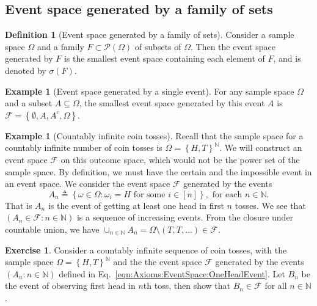 \documentclass[letterpaper,10pt,english]{article}
\theoremstyle{plain}
\theoremstyle{definition}
\newtheorem{defn}[thm]{Definition}
\newtheorem{exmp}[thm]{Example}
\newtheorem{exerc}[thm]{Exercise}
\theoremstyle{remark}
\newcommand{\EQ}[1]{\begin{equation*}#1\end{equation*}}
\newcommand{\EQN}[1]{\begin{equation}#1\end{equation}}
\newcommand{\set}[1]{\left\{#1\right\}}
\newcommand{\N}{\mathbb{N}}
\newcommand{\cP}{\mathcal{P}}
\newcommand{\sF}{\mathscr{F}}
\begin{document}
\subsection{Event space generated by a family of sets}
\begin{defn}[Event space generated by a family of sets] 
Consider a sample space $\Omega$ and a family $F \subset \cP(\Omega)$ of subsets of $\Omega$.   
Then the event space generated by $F$ is the smallest event space containing each element of $F$, 
and is denoted by $\sigma(F)$. 
\end{defn}
\begin{shaded}
\begin{exmp}[Event space generated by a single event]
For any sample space $\Omega$ and a subset $A \subseteq \Omega$, the smallest event space generated by this event $A$ is 
$\sF = \set{\emptyset, A, A^c, \Omega}$. 
\end{exmp}
\begin{exmp}[Countably infinite coin tosses] 
Recall that the sample space for a countably infinite number of coin tosses is $\Omega = \set{H, T}^\N$.  
We will construct an event space $\sF$ on this outcome space, which would not be the power set of the sample space. 
By definition, we must have the certain and the impossible event in an event space.
We consider the event space $\sF$ generated by the events 
\EQN{
\label{eqn:Axioms:EventSpace:OneHeadEvent}
A_n \triangleq \set{\omega \in \Omega: \omega_i = H \text{ for some }i \in [n]},\text{ for each }n \in \N. 
} 
That is $A_n$ is the event of getting at least one head in first $n$ tosses. 
We see that $(A_n \in \sF: n \in \N)$ is a sequence of increasing events.  
From the closure under countable union, we have $\cup_{n \in \N}A_n = \Omega\setminus(T, T, \dots) \in \sF$. 
\end{exmp}
\end{shaded}
\begin{tcolorbox}
\begin{exerc}
Consider a countably infinite sequence of coin tosses, 
with the sample space $\Omega = \set{H,T}^\N$ and the the event space $\sF$ generated by the events $(A_n: n \in \N)$ defined in Eq.~\eqref{eqn:Axioms:EventSpace:OneHeadEvent}. 
Let $B_n$ be the event of observing first head in $n$th toss, 
then show that $B_n \in \sF$ for all $ n \in \N$.  
\end{exerc}
\end{tcolorbox}
\end{document}
